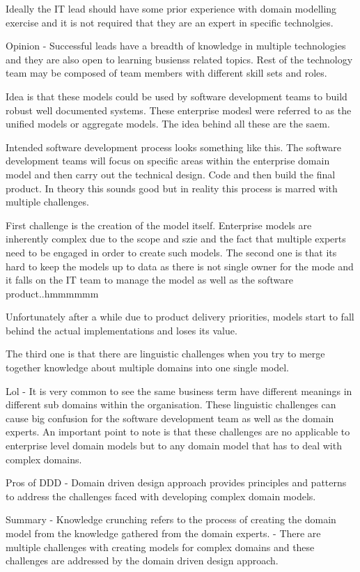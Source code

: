 Ideally the IT lead should have some prior experience with domain modelling exercise and it is not required that they are an expert in specific technolgies.

Opinion
- Successful leads have a breadth of knowledge in multiple technologies and they are also open to learning busienss related topics.
Rest of the technology team may be composed of team members with different skill sets and roles.

Idea is that these models could be used by software development teams to build robust well documented systems.
These enterprise modesl were referred to as the unified models or aggregate models.
The idea behind all these are the saem.

Intended software development process looks something like this.
The software development teams will focus on specific areas within the enterprise domain model and then carry out the technical design.
Code and then build the final product.
In theory this sounds good but in reality this process is marred with multiple challenges.

First challenge is the creation of the model itself.
Enterprise models are inherently complex due to the scope and szie and the fact that multiple experts need to be engaged in order to create such models.
The second one is that its hard to keep the models up to data as there is not single owner for the mode and it falls on the IT team to manage the model as well as the software product..hmmmmmm

Unfortunately after a while due to product delivery priorities, models start to fall behind the actual implementations and loses its value.

The third one is that there are linguistic challenges when you try to merge together knowledge about multiple domains into one single model.

Lol - It is very common to see the same business term have different meanings in different sub domains within the organisation.
These linguistic challenges can cause big confusion for the software development team as well as the domain experts.
An important point to note is that these challenges are no applicable to enterprise level domain models but to any domain model that has to deal with complex domains.

Pros of DDD
- Domain driven design approach provides principles and patterns to address the challenges faced with developing complex domain models.

Summary
- Knowledge crunching refers to the process of creating the domain model from the knowledge gathered from the domain experts.
- There are multiple challenges with creating models for complex domains and these challenges are addressed by the domain driven design approach.

